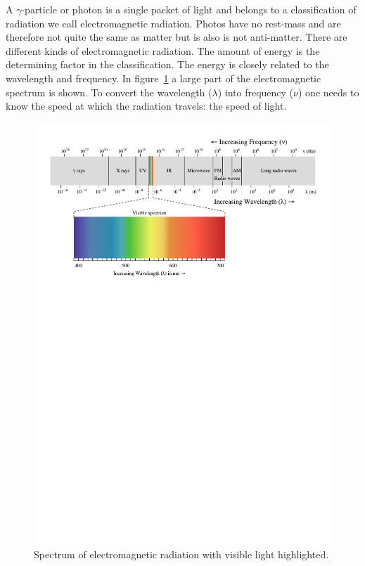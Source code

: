 \documentclass[12pt,a4paper]{article}
\numberwithin{equation}{section}
\numberwithin{figure}{section}
\numberwithin{table}{section}
\begin{document}
A $\gamma$-particle or photon is a single packet of light and belongs to a classification of radiation we call electromagnetic radiation. Photos have no rest-mass and are therefore not quite the same as matter but is also is not anti-matter. There are different kinds of electromagnetic radiation. The amount of energy is the determining factor in the classification. The energy is closely related to the wavelength and frequency. In figure~\ref{fig:em_spec} a large part of the electromagnetic spectrum is shown. To convert the wavelength ($\lambda$) into frequency ($\nu$) one needs to know the speed at which the radiation travels: the speed of light.
\begin{figure}\begin{center}
\includegraphics[scale=0.7]{EM_spectrum.pdf}%
\caption{Spectrum of electromagnetic radiation with visible light highlighted.}\label{fig:em_spec}
\end{center}\end{figure}
\end{document}
